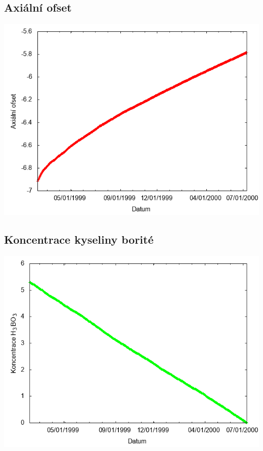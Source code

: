 \documentclass[a4paper,twoside,11pt]{article}
\begin{document}
\subsection*{Axiální ofset}
\begin{center}
\includegraphics[width=.8\textwidth]{graphs/Atlantis_15_ao.png}
\end{center}

\subsection*{Koncentrace kyseliny borité}
\begin{center}
\includegraphics[width=.8\textwidth]{graphs/Atlantis_15_bc.png}
\end{center}
\end{document}
